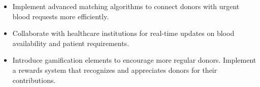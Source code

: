 \begin{itemize}
    \item Implement advanced matching algorithms to connect donors with urgent blood requests more efficiently.
    \item Collaborate with healthcare institutions for real-time updates on blood availability and patient requirements.
    \item  Introduce gamification elements to encourage more regular donors. Implement a rewards system that recognizes and appreciates donors for their contributions.


    
\end{itemize}






